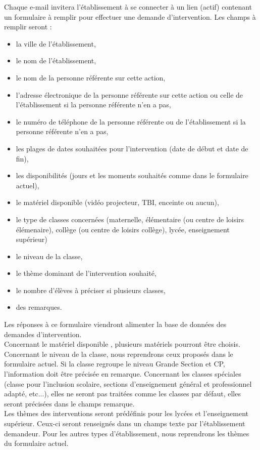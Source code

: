 Chaque e-mail invitera l'établissement à se connecter à un lien (actif) contenant un formulaire à remplir pour effectuer une demande d'intervention. Les champs à remplir seront : 
\begin{itemize}
\item la ville de l'établissement, 
\item le nom de l'établissement, 
\item le nom de la personne référente sur cette action, 
\item l'adresse électronique de la personne référente sur cette action ou celle de l'établissement si la personne  référente n'en a pas, 
\item le numéro de téléphone de la personne référente ou de l'établissement si la personne référente n'en a pas,
\item les plages de dates souhaitées pour l'intervention (date de début et date de fin),
\item les disponibilités (jours et les moments souhaités comme dans le formulaire actuel), 
\item le matériel disponible (vidéo projecteur, TBI, enceinte ou  aucun), 
\item le type de classes concernées (maternelle, élémentaire (ou centre de loisirs élémenaire), collège (ou centre de loisirs collège), lycée, enseignement supérieur)
\item le niveau de la classe, 
\item le thème dominant de l'intervention souhaité, 
\item le nombre d'élèves à préciser si plusieurs classes,
\item des remarques.
\end{itemize}
Les réponses à ce formulaire viendront alimenter la base de données des demandes d'intervention. \\
Concernant le matériel disponible , plusieurs matériels pourront être choisis. \\
Concernant le niveau de la classe, nous reprendrons ceux proposés dans le formulaire actuel. Si la classe regroupe le niveau Grande Section et CP, l'information doit être précisée en remarque.
Concernant les classes spéciales (classe pour l'inclusion scolaire, sections d'enseignement général et professionnel adapté, etc...), elles ne seront pas traitées comme les classes par défaut, elles seront précisées dans le champs remarque.
\\
Les thèmes des interventions seront prédéfinis pour les lycées et l'enseignement supérieur. Ceux-ci seront renseignés dans un champs texte par l'établissement demandeur. Pour les autres types d'établissement, nous reprendrons les thèmes du formulaire actuel.


